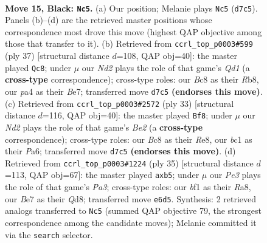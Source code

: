 \documentclass[11pt]{article}
\begin{document}
\clearpage

\begin{figure}[p]\centering
\begin{subfigure}{0.46\textwidth}\centering
\resizebox{\linewidth}{!}{%
\newchessgame
\chessboard[
  setfen={rnbq1rk1/p2nb3/1p2p1p1/3P2P1/P7/2N2N2/1P3P2/R1BQKB1R b KQ - 0 15},
  showmover=false,
  pgfstyle=straightmove, color=movearrow, markmove={d7-c5}
]}
\caption{}
\end{subfigure}\hfill
\begin{subfigure}{0.46\textwidth}\centering
\resizebox{\linewidth}{!}{%
\newchessgame
\chessboard[
  setfen={1r1q1rk1/4b1pp/p3p3/1p1n4/1npPN3/1P6/P2B1PPP/RB2QRK1 b - - 1 19},
  showmover=false,
  pgfstyle=straightmove, color=movearrow, markmove={d8-c8}
]}
\caption{}
\end{subfigure}
\\[4pt]
\begin{subfigure}{0.46\textwidth}\centering
\resizebox{\linewidth}{!}{%
\newchessgame
\chessboard[
  setfen={2rqr1k1/1b2bpp1/p2p1n1p/np6/3NP3/6N1/PPB1RPPP/R1BQ2K1 b - - 2 17},
  showmover=false,
  pgfstyle=straightmove, color=movearrow, markmove={e7-f8}
]}
\caption{}
\end{subfigure}\hfill
\begin{subfigure}{0.46\textwidth}\centering
\resizebox{\linewidth}{!}{%
\newchessgame
\chessboard[
  setfen={r2qr1k1/bb3pp1/p2p1nnp/1P6/3NP3/6NP/1PB2PP1/R1BQR1K1 b - - 0 18},
  showmover=false,
  pgfstyle=straightmove, color=movearrow, markmove={a6-b5}
]}
\caption{}
\end{subfigure}
\caption{\textbf{Move 15, Black: \texttt{Nc5}.} (a) Our position; Melanie plays \texttt{Nc5} (\texttt{d7c5}). Panels (b)--(d) are the retrieved master positions whose correspondence most drove this move (highest QAP objective among those that transfer to it). (b) Retrieved from \texttt{ccrl\_top\_p0003\#599} (ply 37) [structural distance $d$=108, QAP obj=40]: the master played \texttt{Qc8}; under $\mu$ our \emph{Nd2} plays the role of that game's \emph{Qd1} (a \textbf{cross-type} correspondence); cross-type roles: our \emph{B}c8 as their \emph{R}b8, our \emph{p}a4 as their \emph{B}e7; transferred move \texttt{d7c5} \textbf{(endorses this move)}. (c) Retrieved from \texttt{ccrl\_top\_p0003\#2572} (ply 33) [structural distance $d$=116, QAP obj=40]: the master played \texttt{Bf8}; under $\mu$ our \emph{Nd2} plays the role of that game's \emph{Be2} (a \textbf{cross-type} correspondence); cross-type roles: our \emph{B}c8 as their \emph{R}e8, our \emph{b}c1 as their \emph{P}a6; transferred move \texttt{d7c5} \textbf{(endorses this move)}. (d) Retrieved from \texttt{ccrl\_top\_p0003\#1224} (ply 35) [structural distance $d$=113, QAP obj=67]: the master played \texttt{axb5}; under $\mu$ our \emph{Pe3} plays the role of that game's \emph{Pa3}; cross-type roles: our \emph{b}f1 as their \emph{R}a8, our \emph{B}e7 as their \emph{Q}d8; transferred move \texttt{e6d5}. Synthesis: 2 retrieved analogs transferred to \texttt{Nc5} (summed QAP objective 79, the strongest correspondence among the candidate moves); Melanie committed it via the \texttt{search} selector.}
\label{fig:thought-m29}
\end{figure}
\end{document}
